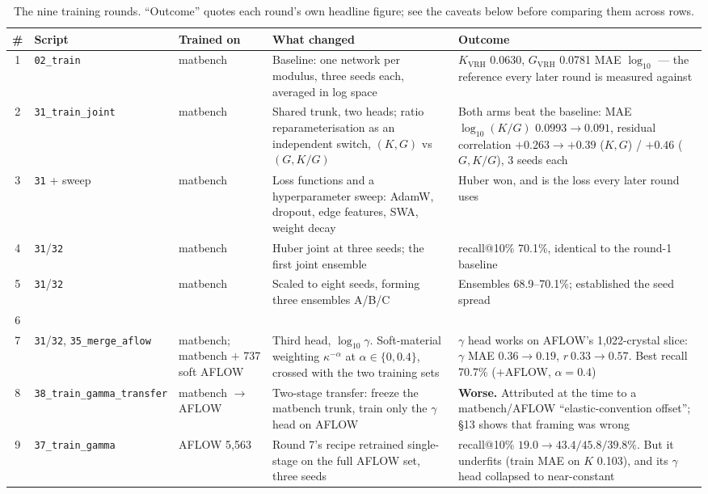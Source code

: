 \documentclass[11pt,a4paper]{article}
\newcommand{\KV}{$K_{\mathrm{VRH}}$}
\newcommand{\GV}{$G_{\mathrm{VRH}}$}
\begin{document}
\begin{table}[h]
\centering
\footnotesize
\caption{The nine training rounds. ``Outcome'' quotes each round's own headline
figure; see the caveats below before comparing them across rows.}
\begin{tabular}{@{}c>{\raggedright\arraybackslash}p{2.6cm}>{\raggedright\arraybackslash}p{1.7cm}>{\raggedright\arraybackslash}p{4.15cm}>{\raggedright\arraybackslash}p{4.4cm}@{}}
\toprule
\# & Script & Trained on & What changed & Outcome \\
\midrule
1 & \texttt{02\_train} & matbench & Baseline: one network per modulus, three
  seeds each, averaged in log space & \KV{} 0.0630, \GV{} 0.0781 MAE
  $\log_{10}$ --- the reference every later round is measured against \\[2pt]
2 & \texttt{31\_train\_\allowbreak{}joint} & matbench & Shared trunk, two heads; ratio
  reparameterisation as an independent switch, $(K,G)$ vs $(G,K/G)$
  & Both arms beat the baseline: MAE $\log_{10}(K/G)$ $0.0993 \to 0.091$,
  residual correlation $+0.263 \to +0.39$ ($K,G$) / $+0.46$ ($G,K/G$),
  3 seeds each \\[2pt]
3 & \texttt{31} + sweep & matbench & Loss functions and a hyperparameter sweep:
  AdamW, dropout, edge features, SWA, weight decay & Huber won, and is the loss
  every later round uses \\[2pt]
4 & \texttt{31}/\texttt{32} & matbench & Huber joint at three seeds; the first
  joint ensemble & recall@10\% 70.1\%, identical to the round-1 baseline \\[2pt]
5 & \texttt{31}/\texttt{32} & matbench & Scaled to eight seeds, forming three
  ensembles A/B/C & Ensembles 68.9--70.1\%; established the seed spread \\[2pt]
6 & \multicolumn{4}{l}{\emph{No surviving artifacts --- see the caveat box
  below. Recorded as a gap, not reconstructed.}} \\[2pt]
7 & \texttt{31}/\texttt{32}, \texttt{35\_merge\_\allowbreak{}aflow} & matbench; matbench
  $+$ 737 soft AFLOW & Third head, $\log_{10}\gamma$. Soft-material weighting
  $\kappa^{-\alpha}$ at $\alpha \in \{0, 0.4\}$, crossed with the two training
  sets & $\gamma$ head works on AFLOW's 1{,}022-crystal slice: $\gamma$ MAE
  $0.36 \to 0.19$, $r\ 0.33 \to 0.57$. Best recall 70.7\%
  ($+$AFLOW, $\alpha{=}0.4$) \\[2pt]
8 & \texttt{38\_train\_\allowbreak{}gamma\_\allowbreak{}transfer} & matbench $\to$ AFLOW & Two-stage
  transfer: freeze the matbench trunk, train only the $\gamma$ head on AFLOW
  & \textbf{Worse.} Attributed at the time to a matbench/AFLOW
  ``elastic-convention offset''; \S13 shows that framing was wrong \\[2pt]
9 & \texttt{37\_train\_\allowbreak{}gamma} & AFLOW 5{,}563 & Round 7's recipe retrained
  single-stage on the full AFLOW set, three seeds & recall@10\%
  $19.0 \to 43.4/45.8/39.8\%$. But it underfits (train MAE on $K$ 0.103), and
  its $\gamma$ head collapsed to near-constant \\
\bottomrule
\end{tabular}
\end{table}
\end{document}
